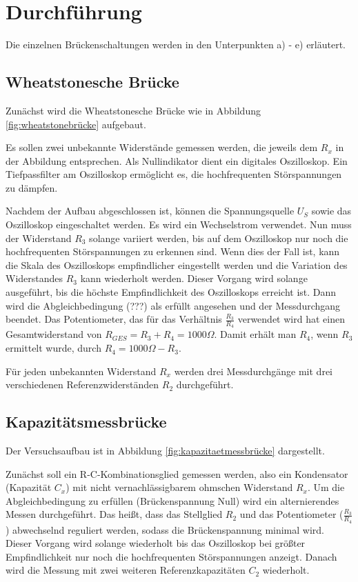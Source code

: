 \section{Durchführung}
\label{sec:Durchführung}

Die einzelnen Brückenschaltungen werden in den Unterpunkten a) - e) erläutert.

\subsection{Wheatstonesche Brücke}
\label{sec:durcha}
Zunächst wird die Wheatstonesche Brücke wie in Abbildung \ref{fig:wheatstonebrücke} aufgebaut.

Es sollen zwei unbekannte Widerstände gemessen werden, die jeweils dem $R_x$ in der Abbildung entsprechen.
Als Nullindikator dient ein digitales Oszilloskop.
Ein Tiefpassfilter am Oszilloskop ermöglicht es, die hochfrequenten Störspannungen zu dämpfen.

Nachdem der Aufbau abgeschlossen ist, können die Spannungsquelle $U_S$ sowie das Oszilloskop eingeschaltet werden.
Es wird ein Wechselstrom verwendet.
Nun muss der Widerstand $R_3$ solange variiert werden, bis auf dem Oszilloskop nur noch die hochfrequenten Störspannungen zu erkennen sind.
Wenn dies der Fall ist, kann die Skala des Oszilloskops empfindlicher eingestellt werden und 
die Variation des Widerstandes $R_3$ kann wiederholt werden.
Dieser Vorgang wird solange ausgeführt, bis die höchste Empfindlichkeit des Oszilloskops erreicht ist.
Dann wird die Abgleichbedingung (???) als erfüllt angesehen und der Messdurchgang beendet.
Das Potentiometer, das für das Verhältnis $\frac{R_3}{R_4}$ verwendet wird hat einen Gesamtwiderstand von $R_{GES} = R_3 + R_4 = 1000 \Omega$. 
Damit erhält man $R_4$, wenn $R_3$ ermittelt wurde, durch $R_4 = 1000 \Omega - R_3$.

Für jeden unbekannten Widerstand $R_x$ werden drei Messdurchgänge mit drei verschiedenen Referenzwiderständen $R_2$ durchgeführt.

\subsection{Kapazitätsmessbrücke}
\label{sec:durchb}
Der Versuchsaufbau ist in Abbildung \ref{fig:kapazitaetmessbrücke} dargestellt.

Zunächst soll ein R-C-Kombinationsglied gemessen werden, also ein Kondensator (Kapazität $C_x$) mit nicht vernachlässigbarem ohmschen Widerstand $R_x$.
Um die Abgleichbedingung zu erfüllen (Brückenspannung Null) wird ein alternierendes Messen durchgeführt.
Das heißt, dass das Stellglied $R_2$ und das Potentiometer ($\frac{R_3}{R_4}$) abwechselnd reguliert werden, sodass die Brückenspannung minimal wird.
Dieser Vorgang wird solange wiederholt bis das Oszilloskop bei größter Empfindlichkeit nur noch die hochfrequenten Störspannungen anzeigt.
Danach wird die Messung mit zwei weiteren Referenzkapazitäten $C_2$ wiederholt.

